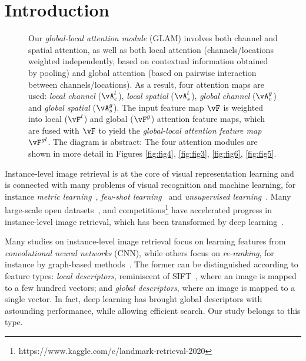 \section{Introduction}
\label{sec:intro}

\begin{figure*}
\centering

\caption{Our \emph{global-local attention module} (GLAM) involves both {\color{blue}channel} and {\color{red}spatial} attention, as well as both {\color{yellow!60!red}local} attention (channels/locations weighted independently, based on contextual information obtained by pooling) and {\color{green!60!black}global} attention (based on pairwise interaction between channels/locations). As a result, four attention maps are used: \emph{local channel} ($\vA_c^l$), \emph{local spatial} ($\vA_s^l$), \emph{global channel} ($\vA_c^g$) and \emph{global spatial} ($\vA_s^g$). The input feature map $\vF$ is weighted into local ($\vF^l$) and global ($\vF^g$) attention feature maps, which are fused with $\vF$ to yield the \emph{global-local attention feature map} $\vF^{gl}$. The diagram is abstract: The four attention modules are shown in more detail in Figures \ref{fig:fig4}, \ref{fig:fig3}, \ref{fig:fig6}, \ref{fig:fig5}.}
\label{fig:glam}
\end{figure*}

Instance-level image retrieval is at the core of visual representation learning and is connected with many problems of visual recognition and machine learning, for instance \emph{metric learning}~\cite{oh2016deep,KKCK20}, \emph{few-shot learning}~\cite{SnellSZ17} and \emph{unsupervised learning}~\cite{chen2020simple}. Many large-scale open datasets~\cite{Babenko01, Radenovic01, Gordo01, Noh01, Weyand01}, and competitions\footnote{https://www.kaggle.com/c/landmark-retrieval-2020} have accelerated progress in instance-level image retrieval, which has been transformed by deep learning~\cite{Babenko01}.

Many studies on instance-level image retrieval focus on learning features from \emph{convolutional neural networks} (CNN), while others focus on \emph{re-ranking}, for instance by graph-based methods~\cite{Donoser01}. The former can be distinguished according to feature types: \emph{local descriptors}, reminiscent of SIFT~\cite{Lowe01}, where an image is mapped to a few hundred vectors; and \emph{global descriptors}, where an image is mapped to a single vector. In fact, deep learning has brought global descriptors with astounding performance, while allowing efficient search. Our study belongs to this type.

